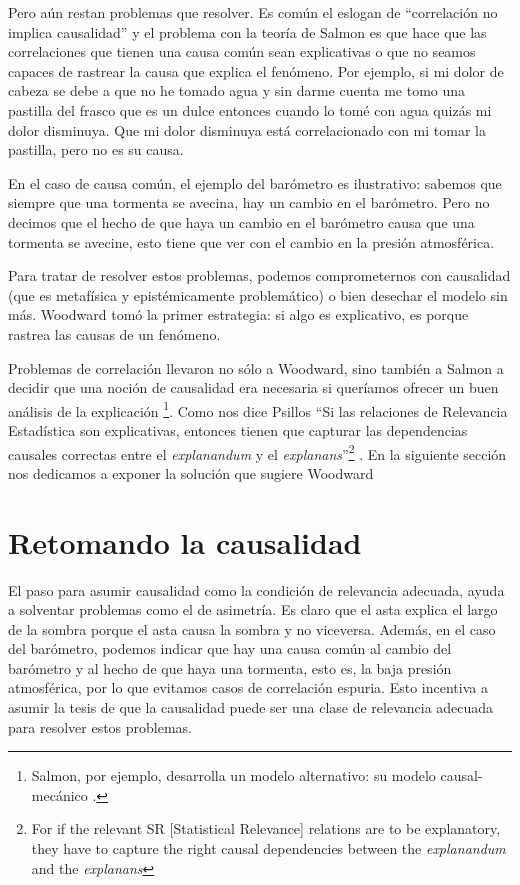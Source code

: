 Pero aún restan problemas que resolver. Es común el eslogan de ``correlación no implica causalidad'' y el problema con la teoría de Salmon es que hace que las correlaciones que tienen una causa común sean explicativas o que no seamos capaces de rastrear la causa que explica el fenómeno. Por ejemplo, si mi dolor de cabeza se debe a que no he tomado agua y sin darme cuenta me tomo una pastilla del frasco que es un dulce entonces cuando lo tomé con agua quizás mi dolor disminuya. Que mi dolor disminuya está correlacionado con mi tomar la pastilla, pero no es su causa.

En el caso de causa común, el ejemplo del barómetro es ilustrativo: sabemos que siempre que una tormenta se avecina, hay un cambio en el barómetro. Pero no decimos que el hecho de que haya un cambio en el barómetro causa que una tormenta se avecine, esto tiene que ver con el cambio en la presión atmosférica.

Para tratar de resolver estos problemas, podemos comprometernos con causalidad (que es metafísica y epistémicamente problemático) o bien desechar el modelo sin más. Woodward tomó la primer estrategia: si algo es explicativo, es porque rastrea las causas de un fenómeno.

Problemas de correlación llevaron no sólo a Woodward, sino también a Salmon a decidir que una noción de causalidad era necesaria si queríamos ofrecer un buen análisis de la explicación \footnote{Salmon, por ejemplo, desarrolla un modelo alternativo: su modelo causal-mecánico \cite{Salmon1994}.}. Como nos dice Psillos ``Si las relaciones de Relevancia Estadística son explicativas, entonces tienen que capturar las dependencias causales correctas entre el \textit{explanandum} y el \textit{explanans}''\footnote{For if the relevant SR [Statistical Relevance] relations are to be explanatory, they have to capture the right causal dependencies between the \textit{explanandum} and the \textit{explanans}} \cite[p. 255]{Psillos2009}. En la siguiente sección nos dedicamos a exponer la solución que sugiere Woodward

\section{Retomando la causalidad}

\noindent El paso para asumir causalidad como la condición de relevancia adecuada, ayuda a solventar problemas como el de asimetría. Es claro que el asta explica el largo de la sombra porque el asta causa la sombra y no viceversa. Además, en el caso del barómetro, podemos indicar que hay una causa común al cambio del barómetro y al hecho de que haya una tormenta, esto es, la baja presión atmosférica, por lo que evitamos casos de correlación espuria. Esto incentiva a asumir la tesis de que la causalidad puede ser una clase de relevancia adecuada para resolver estos problemas.

